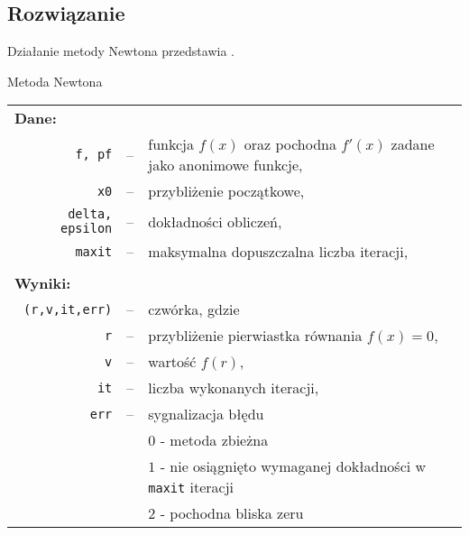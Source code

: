 \documentclass[11pt]{mk-polish-lab-report}
\begin{document}
\subsection{Rozwiązanie}
Działanie metody Newtona przedstawia .
\begin{algorithm}[!h]
\caption{Metoda Newtona}
\label{alg:new}
\DontPrintSemicolon
{}
\end{algorithm} 
\begin{longtable}[l]{r  c  l}
\multicolumn{1}{l}{\textbf{Dane:}}&& \\
\texttt{f, pf}&--&funkcja $f(x)$ oraz pochodna $f'(x)$ zadane jako anonimowe funkcje, \\
\texttt{x0}&--&przybliżenie początkowe, \\
\texttt{delta, epsilon}&--&dokładności obliczeń, \\
\texttt{maxit}&--&maksymalna dopuszczalna liczba iteracji, \\
&& \\
\multicolumn{1}{l}{\textbf{Wyniki:}}&& \\
\texttt{(r,v,it,err)}&--&czwórka, gdzie \\
\texttt{r}&--&przybliżenie pierwiastka równania $f(x) = 0$, \\
\texttt{v}&--&wartość $f(r)$, \\
\texttt{it}&--&liczba wykonanych iteracji, \\
\texttt{err}&--&sygnalizacja błędu \\
&&$0$ - metoda zbieżna \\
&&$1$ - nie osiągnięto wymaganej dokładności w \texttt{maxit} iteracji \\
&&$2$ - pochodna bliska zeru \\
\end{longtable}
\end{document}

